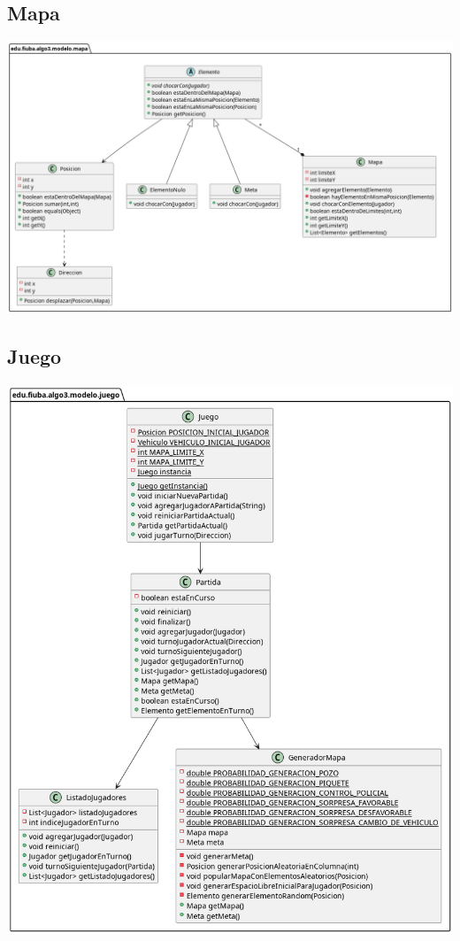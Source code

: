 \documentclass[titlepage,a4paper]{article}
\begin{document}
\subsection{Mapa}
\label{sec:orgbbe2320}

\begin{center}
\includegraphics[width=.9\linewidth]{./diagramas/clases-mapa.png}
\end{center}

\subsection{Juego}
\label{sec:orga71fd7a}

\begin{center}
\includegraphics[width=.9\linewidth]{./diagramas/clases-juego.png}
\end{center}
\end{document}
